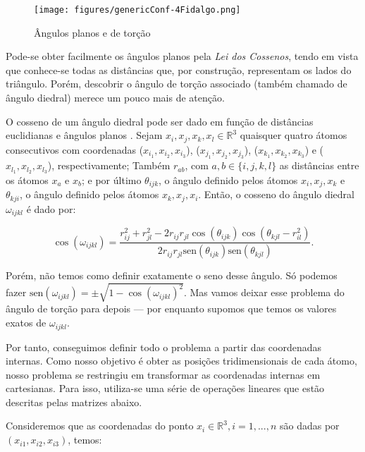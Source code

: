 \begin{figure}[H]
	\begin{center}
		\texttt{[image: figures/genericConf-4Fidalgo.png]}
	\end{center}
	\caption{Ângulos planos e de torção}
	\label{fig:angulos}
\end{figure}

Pode-se obter facilmente os ângulos planos pela \textit{Lei dos Cossenos}, tendo em vista que conhece-se todas as distâncias que, por construção, representam os lados do triângulo. Porém, descobrir o ângulo de torção associado (também chamado de ângulo diedral) merece um pouco mais de atenção. 

O cosseno de um ângulo diedral pode ser dado em função de distâncias euclidianas e ângulos planos \cite{carlileTese}. Sejam $x_i, x_j, x_k, x_l \in \mathbb{R}^3$ quaisquer quatro átomos consecutivos com coordenadas ($x_{i_1}, x_{i_2}, x_{i_3}$), ($x_{j_1}, x_{j_2}, x_{j_3}$), ($x_{k_1}, x_{k_2}, x_{k_3}$) e ($x_{l_1}, x_{l_2}, x_{l_3}$), respectivamente; Também $r_{ab}$, com $a,b \in \{i,j,k,l\}$ as distâncias entre os átomos $x_a$ e $x_b$; e por último $\theta_{ijk}$, o ângulo definido pelos átomos $x_i, x_j, x_k$ e $\theta_{kji}$, o ângulo definido pelos átomos $x_k, x_j, x_i$. Então, o cosseno do ângulo diedral $\omega_{ijkl}$ é dado por:

\begin{equation}
	\cos(\omega_{ijkl}) = \frac{r^2_{ij} + r^2_{jl} - 2r_{ij}r_{jl}\cos(\theta_{ijk})\cos(\theta_{kjl}-r^2_{il})}{2r_{ij}r_{jl}\mbox{sen}(\theta_{ijk})\mbox{sen}(\theta_{kjl})}. \label{eq:cosOmega}
\end{equation}    

Porém, não temos como definir exatamente o seno desse ângulo. Só podemos fazer $\mbox{sen}(\omega_{ijkl}) = \pm\sqrt{1 - \cos(\omega_{ijkl})^2} \label{eq:senOmega}$. Mas vamos deixar esse problema do ângulo de torção para depois --- por enquanto supomos que temos os valores exatos de $\omega_{ijkl}$.

Por tanto, conseguimos definir todo o problema a partir das coordenadas internas. Como nosso objetivo é obter as posições tridimensionais de cada átomo, nosso problema se restringiu em transformar as coordenadas internas em cartesianas. Para isso, utiliza-se uma série de operações lineares que estão descritas pelas matrizes abaixo.

Consideremos que as coordenadas do ponto $x_{i} \in\mathbb{R}^3,i= 1, ...,n $ são dadas por $(x_{i1},x_{i2},x_{i3})$, temos:

